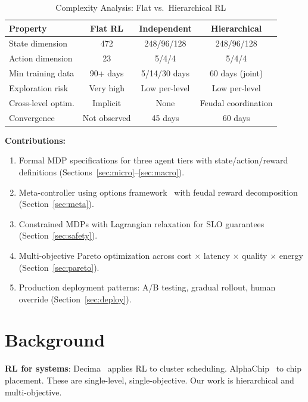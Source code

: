 \documentclass[conference,10pt]{IEEEtran}
\begin{document}
\begin{table}[!htbp]
\caption{Complexity Analysis: Flat vs.\ Hierarchical RL}
\label{tab:complexity}
\centering\scriptsize
\begin{tabular}{@{}lccc@{}}
\toprule
\textbf{Property} & \textbf{Flat RL} & \textbf{Independent} & \textbf{Hierarchical} \\
\midrule
State dimension & 472 & 248/96/128 & 248/96/128 \\
Action dimension & 23 & 5/4/4 & 5/4/4 \\
Min training data & 90+ days & 5/14/30 days & 60 days (joint) \\
Exploration risk & Very high & Low per-level & Low per-level \\
Cross-level optim. & Implicit & None & Feudal coordination \\
Convergence & Not observed & 45 days & 60 days \\
\bottomrule
\end{tabular}
\end{table}


\textbf{Contributions:}
\begin{enumerate}
\item Formal MDP specifications for three agent tiers with state/action/reward definitions (Sections~\ref{sec:micro}--\ref{sec:macro}).
\item Meta-controller using options framework~\cite{sutton1999options} with feudal reward decomposition~\cite{vezhnevets2017feudal} (Section~\ref{sec:meta}).
\item Constrained MDPs with Lagrangian relaxation for SLO guarantees (Section~\ref{sec:safety}).
\item Multi-objective Pareto optimization across cost $\times$ latency $\times$ quality $\times$ energy (Section~\ref{sec:pareto}).
\item Production deployment patterns: A/B testing, gradual rollout, human override (Section~\ref{sec:deploy}).
\end{enumerate}

\section{Background}
\label{sec:bg}

\textbf{RL for systems}: Decima~\cite{mao2019learning} applies RL to cluster scheduling. AlphaChip~\cite{mirhoseini2021graph} to chip placement. These are single-level, single-objective. Our work is hierarchical and multi-objective.
\end{document}
